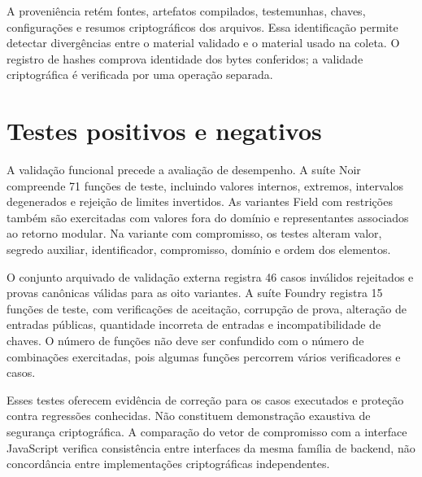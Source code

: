 A proveniência retém fontes, artefatos compilados, testemunhas, chaves, configurações e resumos criptográficos dos arquivos. Essa identificação permite detectar divergências entre o material validado e o material usado na coleta. O registro de hashes comprova identidade dos bytes conferidos; a validade criptográfica é verificada por uma operação separada.

\section{Testes positivos e negativos}

A validação funcional precede a avaliação de desempenho. A suíte Noir compreende 71 funções de teste, incluindo valores internos, extremos, intervalos degenerados e rejeição de limites invertidos. As variantes Field com restrições também são exercitadas com valores fora do domínio e representantes associados ao retorno modular. Na variante com compromisso, os testes alteram valor, segredo auxiliar, identificador, compromisso, domínio e ordem dos elementos.

O conjunto arquivado de validação externa registra 46 casos inválidos rejeitados e provas canônicas válidas para as oito variantes. A suíte Foundry registra 15 funções de teste, com verificações de aceitação, corrupção de prova, alteração de entradas públicas, quantidade incorreta de entradas e incompatibilidade de chaves. O número de funções não deve ser confundido com o número de combinações exercitadas, pois algumas funções percorrem vários verificadores e casos.

Esses testes oferecem evidência de correção para os casos executados e proteção contra regressões conhecidas. Não constituem demonstração exaustiva de segurança criptográfica. A comparação do vetor de compromisso com a interface JavaScript verifica consistência entre interfaces da mesma família de backend, não concordância entre implementações criptográficas independentes.
